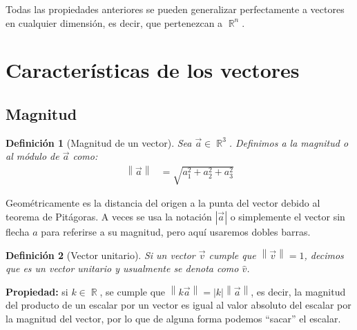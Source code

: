 \documentclass[12pt, fleqn]{report}                             %
\newcommand{\abs}[1]{\left\lvert #1 \right\lvert}               %
\newcommand{\Abs}[1]{\left\lVert #1 \right\lVert}               %
\newtheorem{Definition}{Definición}[section]                    %
\DeclareMathOperator \Reals        {\mathbb{R}}                 %
\begin{document}
            Todas las propiedades anteriores se pueden generalizar perfectamente a vectores en cualquier dimensión, es decir, que pertenezcan a $\Reals^n$.
            
        \section{Características de los vectores}
        
            \subsection{Magnitud}
            
            \begin{Definition}[Magnitud de un vector]
                Sea $\vec{a} \in \Reals^3$. Definimos a la magnitud o al módulo de $\vec{a}$ como:
                \begin{align}
                    \Abs{\vec{a}} &= \sqrt{a_1^2 + a_2^2 + a_3^2}
                \end{align}
            \end{Definition}
        
            Geométricamente es la distancia del origen a la punta del vector debido al teorema de Pitágoras. A veces se usa la notación $\abs{\vec{a}}$ o simplemente el vector sin flecha $a$ para referirse a su magnitud, pero aquí usaremos dobles barras.
            
            \begin{Definition}[Vector unitario]
                Si un vector $\vec{v}$ cumple que $\Abs{\vec{v}}=1$, decimos que es un \emph{vector unitario} y usualmente se denota como $\hat{v}$.
            \end{Definition}
            
            \textbf{Propiedad:} si $k \in \Reals$, se cumple que $\Abs{k\vec{a}} = \abs{k} \Abs{\vec{a}}$, es decir, la magnitud del producto de un escalar por un vector es igual al valor absoluto del escalar por la magnitud del vector, por lo que de alguna forma podemos ``sacar'' el escalar.
            
\end{document}
